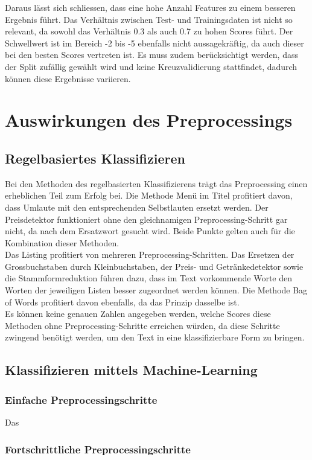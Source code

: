 Daraus lässt sich schliessen, dass eine hohe Anzahl Features zu einem besseren Ergebnis führt.
Das Verhältnis zwischen Test- und Trainingsdaten ist nicht so relevant, da sowohl das Verhältnis 0.3 als auch 0.7 zu hohen Scores führt.
Der Schwellwert ist im Bereich -2 bis -5 ebenfalls nicht aussagekräftig, da auch dieser bei den besten Scores vertreten ist.
Es muss zudem berücksichtigt werden, dass der Split zufällig gewählt wird und keine Kreuzvalidierung stattfindet, dadurch können diese Ergebnisse variieren.
\section{Auswirkungen des Preprocessings}
\subsection{Regelbasiertes Klassifizieren}
Bei den Methoden des regelbasierten Klassifizierens trägt das Preprocessing einen erheblichen Teil zum Erfolg bei.
Die Methode \glqq Menü im Titel\grqq{} profitiert davon, dass Umlaute mit den entsprechenden Selbstlauten ersetzt werden.
Der Preisdetektor funktioniert ohne den gleichnamigen Preprocessing-Schritt gar nicht, da nach dem Ersatzwort gesucht wird.
Beide Punkte gelten auch für die Kombination dieser Methoden.\\
Das Listing profitiert von mehreren Preprocessing-Schritten.
Das Ersetzen der Grossbuchstaben durch Kleinbuchstaben, der Preis- und Getränkedetektor sowie die Stammformreduktion führen dazu, dass im Text vorkommende Worte den Worten der jeweiligen Listen besser zugeordnet werden können.
Die Methode \glqq Bag of Words\grqq{} profitiert davon ebenfalls, da das Prinzip dasselbe ist.\\
Es können keine genauen Zahlen angegeben werden, welche Scores diese Methoden ohne Preprocessing-Schritte erreichen würden, da diese Schritte zwingend benötigt werden, um den Text in eine klassifizierbare Form zu bringen.
\subsection{Klassifizieren mittels Machine-Learning}
\subsubsection{Einfache Preprocessingschritte}
Das
\subsubsection{Fortschrittliche Preprocessingschritte}
